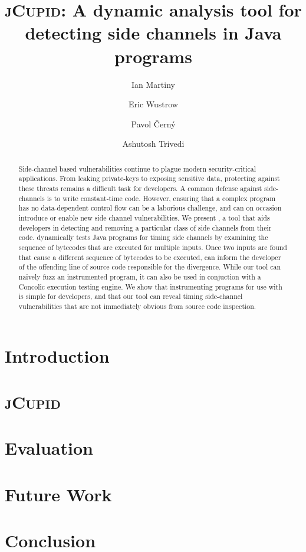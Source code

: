 \documentclass{llncs}
\begin{document}
\title{\textsc{jCupid}: A dynamic analysis tool for detecting side channels in Java programs}
\author{
  Ian Martiny
  \and
  Eric Wustrow
  \and
  Pavol {\v C}ern\'y
  \and
  Ashutosh Trivedi
}


\maketitle

\begin{abstract}
  Side-channel based vulnerabilities continue to plague modern security-critical
  applications.
  From leaking private-keys to exposing sensitive data, 
  protecting against these threats remains a difficult task for developers. 
  A common defense against side-channels is to write constant-time code.
  However, ensuring that a complex program has no data-dependent control flow
  can be a laborious challenge, and can on occasion introduce or enable new side
  channel vulnerabilities.
  We present \jcupid{}, a tool that aids developers in detecting and
  removing a particular class of side channels from their code.
  \jcupid{} dynamically tests Java programs for timing side channels by examining
  the sequence of bytecodes that are executed for multiple inputs.
  Once two inputs are found that cause a different sequence of bytecodes to be
  executed, \jcupid{} can inform the developer of the offending line of source code
  responsible for the divergence.
  While our tool can naively fuzz an instrumented program, it can also be used
  in conjuction with a Concolic execution testing engine.
  We show that instrumenting programs for use with \jcupid{} is simple for
  developers, and that our tool can reveal timing side-channel vulnerabilities
  that are not immediately obvious from source code inspection.
\end{abstract}



\section{Introduction}
\label{sec:introduction}



\section{\textsc{jCupid}}
\label{sec:jcupid}


\section{Evaluation}
\label{sec:evaluation}


\section{Future Work}
\label{sec:future}


\section{Conclusion}
\label{sec:conclusion}






\newpage
\appendix

\end{document}
